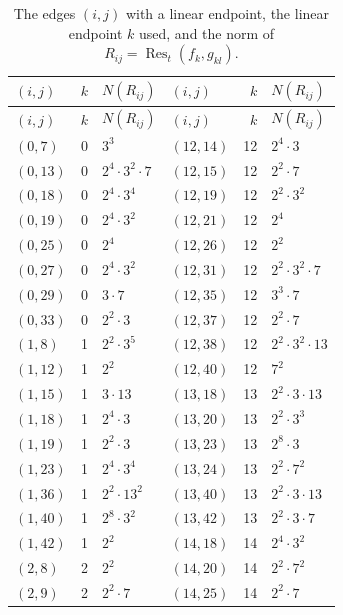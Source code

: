 \documentclass[11pt]{article}
\begin{document}
\begingroup\small
\setlength{\LTcapwidth}{\textwidth}
\begin{longtable}{@{}lrl@{\qquad}lrl@{}}
\caption{The edges $(i,j)$ with a linear endpoint, the linear endpoint $k$ used, and the norm of $R_{ij}=\operatorname{Res}_t(f_k,g_{kl})$.}\label{tab:sep}\\
\hline $(i,j)$ & $k$ & $N(R_{ij})$ & $(i,j)$ & $k$ & $N(R_{ij})$\\\hline\endfirsthead\hline $(i,j)$ & $k$ & $N(R_{ij})$ & $(i,j)$ & $k$ & $N(R_{ij})$\\\hline\endhead\hline\endfoot
$(0,7)$ & 0 & $3^{3}$ & $(12,14)$ & 12 & $2^{4}\cdot 3$\\
$(0,13)$ & 0 & $2^{4}\cdot 3^{2}\cdot 7$ & $(12,15)$ & 12 & $2^{2}\cdot 7$\\
$(0,18)$ & 0 & $2^{4}\cdot 3^{4}$ & $(12,19)$ & 12 & $2^{2}\cdot 3^{2}$\\
$(0,19)$ & 0 & $2^{4}\cdot 3^{2}$ & $(12,21)$ & 12 & $2^{4}$\\
$(0,25)$ & 0 & $2^{4}$ & $(12,26)$ & 12 & $2^{2}$\\
$(0,27)$ & 0 & $2^{4}\cdot 3^{2}$ & $(12,31)$ & 12 & $2^{2}\cdot 3^{2}\cdot 7$\\
$(0,29)$ & 0 & $3\cdot 7$ & $(12,35)$ & 12 & $3^{3}\cdot 7$\\
$(0,33)$ & 0 & $2^{2}\cdot 3$ & $(12,37)$ & 12 & $2^{2}\cdot 7$\\
$(1,8)$ & 1 & $2^{2}\cdot 3^{5}$ & $(12,38)$ & 12 & $2^{2}\cdot 3^{2}\cdot 13$\\
$(1,12)$ & 1 & $2^{2}$ & $(12,40)$ & 12 & $7^{2}$\\
$(1,15)$ & 1 & $3\cdot 13$ & $(13,18)$ & 13 & $2^{2}\cdot 3\cdot 13$\\
$(1,18)$ & 1 & $2^{4}\cdot 3$ & $(13,20)$ & 13 & $2^{2}\cdot 3^{3}$\\
$(1,19)$ & 1 & $2^{2}\cdot 3$ & $(13,23)$ & 13 & $2^{8}\cdot 3$\\
$(1,23)$ & 1 & $2^{4}\cdot 3^{4}$ & $(13,24)$ & 13 & $2^{2}\cdot 7^{2}$\\
$(1,36)$ & 1 & $2^{2}\cdot 13^{2}$ & $(13,40)$ & 13 & $2^{2}\cdot 3\cdot 13$\\
$(1,40)$ & 1 & $2^{8}\cdot 3^{2}$ & $(13,42)$ & 13 & $2^{2}\cdot 3\cdot 7$\\
$(1,42)$ & 1 & $2^{2}$ & $(14,18)$ & 14 & $2^{4}\cdot 3^{2}$\\
$(2,8)$ & 2 & $2^{2}$ & $(14,20)$ & 14 & $2^{2}\cdot 7^{2}$\\
$(2,9)$ & 2 & $2^{2}\cdot 7$ & $(14,25)$ & 14 & $2^{2}\cdot 7$\\

\end{longtable}
\end{document}
